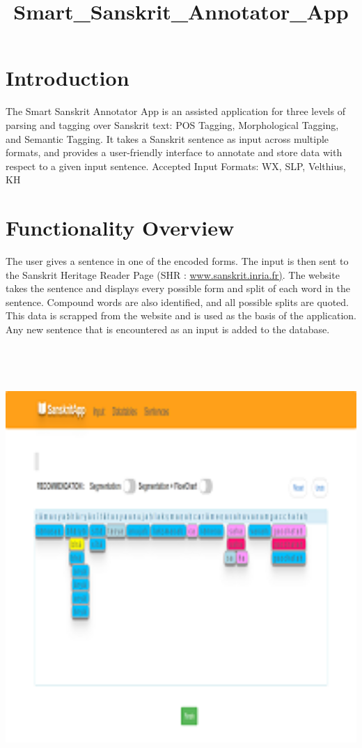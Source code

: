\documentclass[12pt]{article}
\title{Smart_Sanskrit\_Annotator\_App}
\begin{document}
\section{Introduction}
The Smart Sanskrit Annotator App is an assisted application for three levels of parsing and tagging over Sanskrit text: POS Tagging, Morphological Tagging, and Semantic Tagging. It takes a Sanskrit sentence as input across multiple formats, and provides a user-friendly interface to annotate and store data with respect to a given input sentence.
Accepted Input Formats: WX, SLP, Velthius, KH

\section{Functionality Overview}
The user gives a sentence in one of the encoded forms. The input is then sent to the Sanskrit Heritage Reader Page (SHR : \href{http://sanskrit.inria.fr/}{www.sanskrit.inria.fr)}. The website takes the sentence and displays every possible form  and split of each word in the sentence. Compound words are also identified, and all possible splits are quoted. This data is scrapped from the website and is used as the basis of the application. Any new sentence that is encountered as an input is added to the database.\\ \\

\\ \\ \\ 
\includegraphics[width=150mm,scale=20]{capture2}\\ \\
\end{document}
